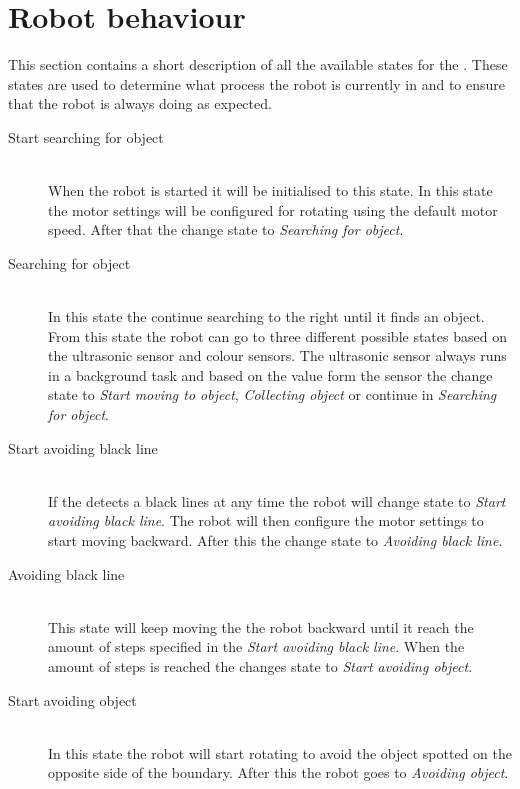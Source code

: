 \section{Robot behaviour} \label{sec:robot_behaviour}
This section contains a short description of all the available states for the \projname{}. These states are used to determine what process the robot is currently in and to ensure that the robot is always doing as expected.

\begin{description}
\item[Start searching for object] \hfill \\
When the robot is started it will be initialised to this state. In this state the motor settings will be configured for rotating using the default motor speed. After that the \projname{} change state to \emph{Searching for object}.

\item[Searching for object] \hfill \\
In this state the \projname{} continue searching to the right until it finds an object. From this state the robot can go to three different possible states based on the ultrasonic sensor and colour sensors. The ultrasonic sensor always runs in a background task and based on the value form the sensor the \projname{} change state to \emph{Start moving to object}, \emph{Collecting object} or continue in \emph{Searching for object}. 

\item[Start avoiding black line] \hfill \\
If the \projname{} detects a black lines at any time the robot will change state to \emph{Start avoiding black line}. The robot will then configure the motor settings to start moving backward. After this the \projname{} change state to \emph{Avoiding black line}. 

\item[Avoiding black line] \hfill \\
This state will keep moving the the robot backward until it reach the amount of steps specified in the \emph{Start avoiding black line}. When the amount of steps is reached the \projname{} changes state to \emph{Start avoiding object}.

\item[Start avoiding object] \hfill \\
In this state the robot will start rotating to avoid the object spotted on the opposite side of the boundary. After this the robot goes to \emph{Avoiding object}. 


\end{description}

